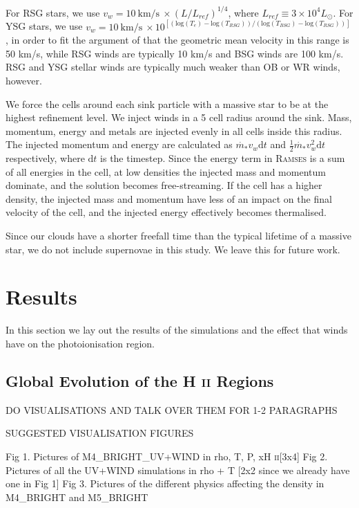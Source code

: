 \documentclass[a4paper,fleqn,usenatbib]{mnras}
\newcommand{\HII}{H \textsc{ii}\xspace}
\begin{document}
For RSG stars, we use $v_w = 10 \mathrm{~km/s~} \times (L/L_{ref})^{1/4}$, where $L_{ref} \equiv 3 \times 10^4 L_{\odot}$. For YSG stars, we use  $v_w = 10 \mathrm{~km/s~} \times 10^{[(\mathrm{log}(T_e) - \mathrm{log}(T_{RSG}))/(\mathrm{log}(T_{BSG}) - \mathrm{log}(T_{RSG}))]}$, in order to fit the argument of \citet{Gatto2017} that the geometric mean velocity in this range is 50 km/s, while RSG winds are typically 10 km/s and BSG winds are 100 km/s. RSG and YSG stellar winds are typically much weaker than OB or WR winds, however.

We force the cells around each sink particle with a massive star to be at the highest refinement level. We inject winds in a 5 cell radius around the sink. Mass, momentum, energy and metals are injected evenly in all cells inside this radius. The injected momentum and energy are calculated as $\dot{m_*} v_w \mathrm{d}t$ and $\frac{1}{2} \dot{m_*} v_w^2 \mathrm{d}t$ respectively, where $\mathrm{d}t$ is the timestep. Since the energy term in \textsc{Ramses} is a sum of all energies in the cell, at low densities the injected mass and momentum dominate, and the solution becomes free-streaming. If the cell has a higher density, the injected mass and momentum have less of an impact on the final velocity of the cell, and the injected energy effectively becomes thermalised.

Since our clouds have a shorter freefall time than the typical lifetime of a massive star, we do not include supernovae in this study. We leave this for future work. 

\section{Results}

In this section we lay out the results of the simulations and the effect that winds have on the photoionisation region.

\subsection{Global Evolution of the \HII Regions}

DO VISUALISATIONS AND TALK OVER THEM FOR 1-2 PARAGRAPHS

SUGGESTED VISUALISATION FIGURES

Fig 1. Pictures of M4_BRIGHT_UV+WIND in rho, T, P, x\HII [3x4]
Fig 2. Pictures of all the UV+WIND simulations in rho + T [2x2 since we already have one in Fig 1]
Fig 3. Pictures of the different physics affecting the density in M4_BRIGHT and M5_BRIGHT 
\end{document}
